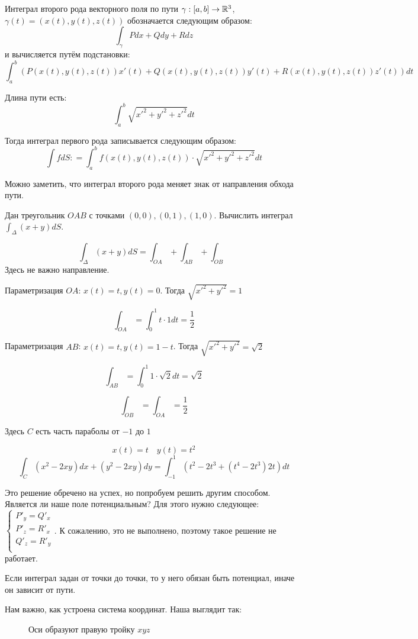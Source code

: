 

\cfoot{}



Интеграл второго рода векторного поля по пути \(\gamma : [a, b] \to \mathbb{R}^3\), \(\gamma(t) = (x(t), y(t), z(t))\) обозначается следующим образом:
\[\int_\gamma P dx + Q dy + R dz\]
и вычисляется путём подстановки:
\[\int_a^b (P(x(t), y(t), z(t))x'(t) + Q(x(t), y(t), z(t))y'(t) + R(x(t), y(t), z(t))z'(t)) dt \]

Длина пути есть:
\[\int_a^b \sqrt{x'^2 + y'^2 + z'^2} dt\]

Тогда интеграл первого рода записывается следующим образом:
\[\int f dS : = \int_a^b f(x(t), y(t), z(t)) \cdot \sqrt{x'^2 + y'^2 + z'^2} dt\]

Можно заметить, что интеграл второго рода меняет знак от направления обхода пути.

\begin{exercise}[4221]
    Дан треугольник \(OAB\) с точками \((0, 0), (0, 1), (1, 0)\). Вычислить интеграл \(\int_\Delta (x + y) dS\).

    \[\int_\Delta (x + y) dS = \int_{OA} + \int_{AB} + \int_{OB}\]
    Здесь не важно направление.

    Параметризация \(OA\): \(x(t) = t, y(t) = 0\). Тогда \(\sqrt{x'^2 + y'^2} = 1\)

    \[\int_{OA} = \int_0^1 t\cdot 1 dt = \frac{1}{2}\]

    Параметризация \(AB\): \(x(t) = t, y(t) = 1 - t\). Тогда \(\sqrt{x'^2 + y'^2} = \sqrt{2}\)

    \[\int_{AB} = \int_0^1 1 \cdot \sqrt{2} dt = \sqrt{2}\]

    \[\int_{OB} = \int_{OA} = \frac{1}{2}\]
\end{exercise}

\begin{exercise}[4250]
    Здесь \(C\) есть часть параболы от \( - 1\) до \(1\)

    \[x(t) = t \quad y(t) = t^2\]
    \[\int_C (x^2 - 2xy)dx + (y^2 - 2xy)dy = \int_{ - 1}^1 (t^2 - 2t^3 + (t^4 - 2t^3) 2t)dt\] %

    Это решение обречено на успех, но попробуем решить другим способом. Является ли наше поле потенциальным? Для этого нужно следующее: \(\begin{cases}
        P'_y = Q'_x \\
        P'_z = R'_x \\
        Q'_z = R'_y \\
    \end{cases}\). К сожалению, это не выполнено, поэтому такое решение не работает.
\end{exercise}

Если интеграл задан от точки до точки, то у него обязан быть потенциал, иначе он зависит от пути.

Нам важно, как устроена система координат. Наша выглядит так:

\begin{figure}[h]
    \centering
    
    \caption{Оси образуют правую тройку \(xyz\)}
\end{figure}

